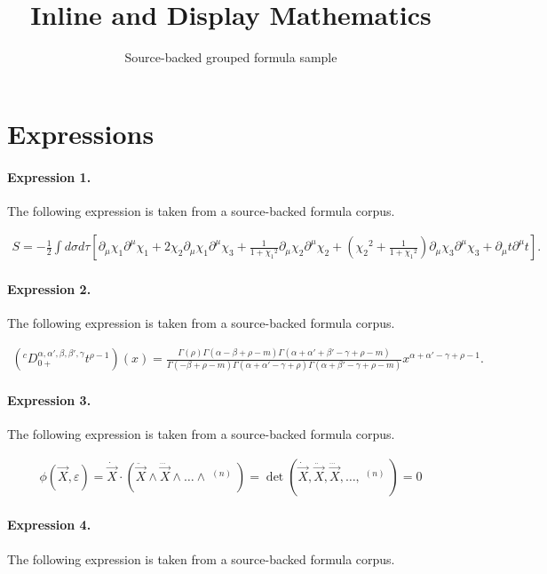 \documentclass[11pt]{article}
\title{Inline and Display Mathematics}
\author{Source-backed grouped formula sample}
\date{}
\begin{document}
\maketitle
\section{Expressions}
\paragraph{Expression 1.} The following expression is taken from a source-backed formula corpus.

\begin{align*}S = -\frac{1}{2}\int\!d\sigma d\tau[\partial_\mu\chi_1 \partial^\mu\chi_1 + 2\chi_2\partial_\mu\chi_1 \partial^\mu\chi_3 + \frac{1}{1+{\chi_1}^2}\partial_\mu\chi_2 \partial^\mu\chi_2 + ({\chi_2}^2+\frac{1}{1+{\chi_1}^2})\partial_\mu\chi_3 \partial^\mu\chi_3 +\partial_\mu t \partial^\mu t].\end{align*}

\paragraph{Expression 2.} The following expression is taken from a source-backed formula corpus.

\begin{align*}\left({}^{c}D_{0+}^{\alpha,\alpha',\beta,\beta',\gamma}t^{\rho-1}\right)(x)=\frac{\Gamma(\rho)\Gamma(\alpha-\beta+\rho-m)\Gamma(\alpha+\alpha'+\beta'-\gamma+\rho-m)}{\Gamma(-\beta+\rho-m)\Gamma(\alpha+\alpha'-\gamma+\rho)\Gamma(\alpha+\beta'-\gamma+\rho-m)}x^{\alpha+\alpha'-\gamma+\rho-1}.\end{align*}

\paragraph{Expression 3.} The following expression is taken from a source-backed formula corpus.

\begin{align*} \phi ( {\vec {X}, \varepsilon} ) = \dot { \vec{X} } \cdot ( {\ddot {\vec {X}} \wedge \dddot{\vec {X}}\wedge \ldots\wedge \mathop {\vec {X}}\limits^{\left( n \right)} } ) = \det( {\dot {\vec {X}},\ddot {\vec {X}}, \dddot{\vec {X}},\ldots ,\mathop{\vec {X}}\limits^{\left( n \right)} } ) = 0\end{align*}

\paragraph{Expression 4.} The following expression is taken from a source-backed formula corpus.
\end{document}
